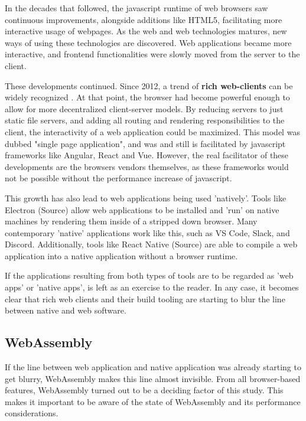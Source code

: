 In the decades that followed, the javascript runtime of web browsers saw continuous improvements, alongside additions like HTML5, facilitating more interactive usage of webpages.
As the web and web technologies matures, new ways of using these technologies are discovered.
Web applications became more interactive, and frontend functionalities were slowly moved from the server to the client. 

These developments continued.
Since 2012, a trend of \textbf{rich web-clients} can be widely recognized \cite{hamilton_client-side_2014, panidi_hybrid_2015, kulawiak_analysis_2019}.
At that point, the browser had become powerful enough to allow for more decentralized client-server models.
By reducing servers to just static file servers, and adding all routing and rendering responsibilities to the client, the interactivity of a web application could be maximized. 
This model was dubbed "single page application", and was and still is facilitated by javascript frameworks like Angular, React and Vue.
However, the real facilitator of these developments are the browsers vendors themselves, as these frameworks would not be possible without the performance increase of javascript. 

This growth has also lead to web applications being used 'natively'. 
Tools like Electron (Source) allow web applications to be installed and 'run' on native machines by rendering them inside of a stripped down browser. 
Many contemporary 'native' applications work like this, such as VS Code, Slack, and Discord.
Additionally, tools like React Native (Source) are able to compile a web application into a native application without a browser runtime.  

If the applications resulting from both types of tools are to be regarded as 'web apps' or 'native apps', is left as an exercise to the reader. 
In any case, it becomes clear that rich web clients and their build tooling are starting to blur the line between native and web software.

\subsection{WebAssembly}
\label{sec:background-wasm}

If the line between web application and native application was already starting to get blurry, WebAssembly makes this line almost invisible. 
From all browser-based features, WebAssembly turned out to be a deciding factor of this study. This makes it important to be aware of the state of WebAssembly and its performance considerations.


